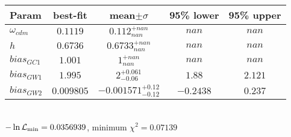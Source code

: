 \begin{tabular}{|l|c|c|c|c|} 
 \hline 
Param & best-fit & mean$\pm\sigma$ & 95\% lower & 95\% upper \\ \hline 
$\omega_{cdm }$ &$0.1119$ & $0.112_{nan}^{+nan}$ & $nan$ & $nan$ \\ 
$h$ &$0.6736$ & $0.6733_{nan}^{+nan}$ & $nan$ & $nan$ \\ 
$bias_{GC 1 }$ &$1.001$ & $1_{nan}^{+nan}$ & $nan$ & $nan$ \\ 
$bias_{GW 1 }$ &$1.995$ & $2_{-0.06}^{+0.061}$ & $1.88$ & $2.121$ \\ 
$bias_{GW 2 }$ &$0.009805$ & $-0.001571_{-0.12}^{+0.12}$ & $-0.2438$ & $0.237$ \\ 
\hline 
 \end{tabular} \\ 
$-\ln{\cal L}_\mathrm{min} =0.0356939$, minimum $\chi^2=0.07139$ \\ 
